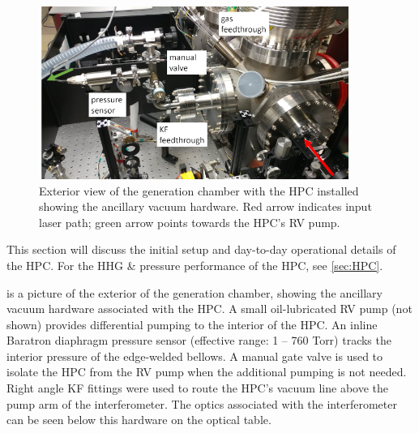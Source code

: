 \begin{figure}
	\centering
	\includegraphics[width=0.9\textwidth]{figures/app1/HPC_outside_view_lowres.png}
	\caption{Exterior view of the generation chamber with the HPC installed showing the ancillary vacuum hardware. Red arrow indicates input laser path; green arrow points towards the HPC's RV pump.}
	\label{fig:HPC_outside_view}
\end{figure}

This section will discuss the initial setup and day-to-day operational details of the HPC. For the HHG \& pressure performance of the HPC, see \cref{sec:HPC}.

 is a picture of the exterior of the generation chamber, showing the ancillary vacuum hardware associated with the HPC. A small oil-lubricated RV pump (not shown) provides differential pumping to the interior of the HPC. An inline Baratron diaphragm pressure sensor (effective range: 1 -- 760 Torr) tracks the interior pressure of the edge-welded bellows. A manual gate valve is used to isolate the HPC from the RV pump when the additional pumping is not needed. Right angle KF fittings were used to route the HPC's vacuum line above the pump arm of the interferometer. The optics associated with the interferometer can be seen below this hardware on the optical table.

